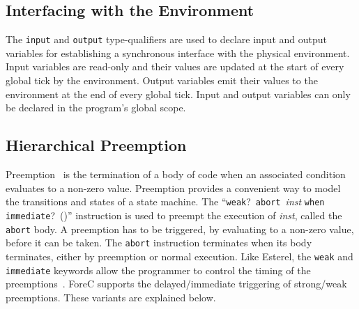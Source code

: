 \subsection{Interfacing with the Environment}
\label{sec:forecLanguage_io}
The \verb$input$ and \verb$output$ type-qualifiers are used to declare
input and output variables for establishing a synchronous interface with 
the physical environment. Input variables are read-only 
and their values are updated at the start of every global tick by the 
environment. Output variables emit their values to the environment at 
the end of every global tick. Input and output variables can only be 
declared in the program's global scope.



\subsection{Hierarchical Preemption}
Preemption~\cite{timed_preemption} is the termination of a body of code when an associated 
condition evaluates to a non-zero value. Preemption provides a 
convenient way to model the transitions and states of a state machine.
The ``\verb$weak$?~\verb$abort$~\emph{inst} \verb$when immediate$?~(\expression{})''
instruction is used to preempt the execution of 
\emph{inst}, called the \verb$abort$ body. A preemption has to be
triggered, by evaluating \expression{} to a 
non-zero value, before it can be taken. 
The \verb$abort$ instruction terminates when its
body terminates, either by preemption or normal execution.
Like Esterel, the \verb$weak$ and \verb$immediate$ keywords 
allow the programmer to control the timing of the 
preemptions~\cite{timed_preemption}. ForeC supports the 
delayed/immediate triggering of strong/weak preemptions. 
These variants are explained below.

